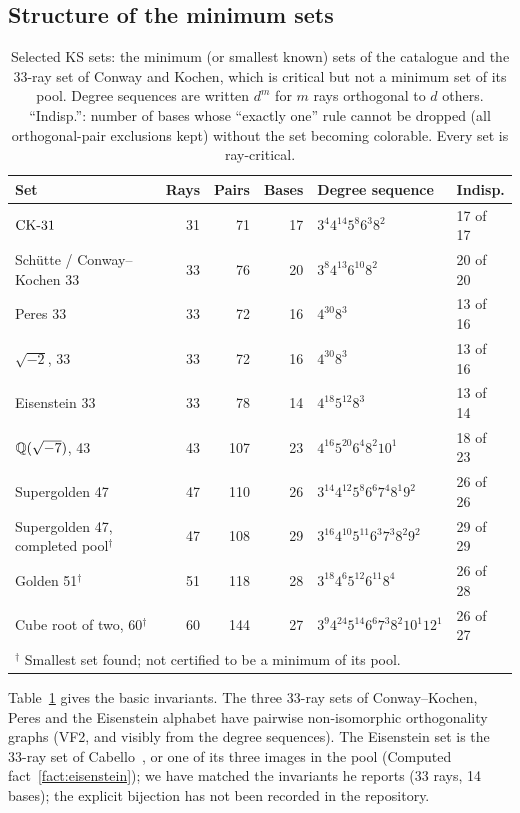 \subsection{Structure of the minimum sets}

\begin{table}[t]
\centering
\caption{Selected KS sets: the minimum (or smallest known) sets of the catalogue and the
33-ray set of Conway and Kochen, which is critical but not a minimum set of its pool.  Degree sequences are written
$d^{m}$ for $m$ rays orthogonal to $d$ others.  ``Indisp.'': number of bases whose ``exactly
one'' rule cannot be dropped (all orthogonal-pair exclusions kept) without the set becoming
colorable.  Every set is ray-critical.}
\label{tab:profiles}
\small
\begin{tabular}{lrrrll}
\toprule
Set & Rays & Pairs & Bases & Degree sequence & Indisp. \\
\midrule
$\mathrm{CK}\text{-}31$ & 31 & 71 & 17 & $3^{4}4^{14}5^{8}6^{3}8^{2}$ & 17 of 17 \\
Sch\"utte / Conway--Kochen 33 & 33 & 76 & 20 & $3^{8}4^{13}6^{10}8^{2}$ & 20 of 20 \\
Peres 33 & 33 & 72 & 16 & $4^{30}8^{3}$ & 13 of 16 \\
$\sqrt{-2}$, 33 & 33 & 72 & 16 & $4^{30}8^{3}$ & 13 of 16 \\
Eisenstein 33 & 33 & 78 & 14 & $4^{18}5^{12}8^{3}$ & 13 of 14 \\
$\mathbb{Q}(\sqrt{-7})$, 43 & 43 & 107 & 23 & $4^{16}5^{20}6^{4}8^{2}10^{1}$ & 18 of 23 \\
Supergolden 47 & 47 & 110 & 26 & $3^{14}4^{12}5^{8}6^{6}7^{4}8^{1}9^{2}$ & 26 of 26 \\
Supergolden 47, completed pool$^{\dagger}$ & 47 & 108 & 29 & $3^{16}4^{10}5^{11}6^{3}7^{3}8^{2}9^{2}$ & 29 of 29 \\
Golden 51$^{\dagger}$ & 51 & 118 & 28 & $3^{18}4^{6}5^{12}6^{11}8^{4}$ & 26 of 28 \\
Cube root of two, 60$^{\dagger}$ & 60 & 144 & 27 & $3^{9}4^{24}5^{14}6^{6}7^{3}8^{2}10^{1}12^{1}$ & 26 of 27 \\
\midrule
\multicolumn{6}{l}{$^{\dagger}$ Smallest set found; not certified to be a minimum of its pool.}\\
\bottomrule
\end{tabular}
\end{table}

Table~\ref{tab:profiles} gives the basic invariants.  The three 33-ray sets of Conway--Kochen,
Peres and the Eisenstein alphabet have pairwise non-isomorphic orthogonality graphs (VF2, and
visibly from the degree sequences).  The Eisenstein set is the 33-ray set of
Cabello~\cite{Cabello2025simplest}, or one of its three images in the pool
(Computed fact~\ref{fact:eisenstein}); we have matched the invariants he reports (33 rays, 14
bases); the explicit bijection has not been recorded in the repository.


